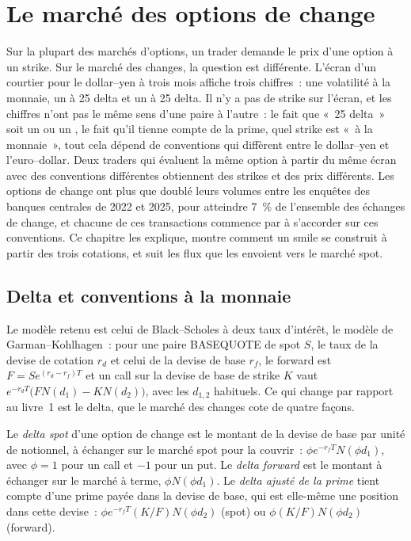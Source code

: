 \chapter{Le marché des options de change}\label{ch:m2:the-fx-options-market}

Sur la plupart des marchés d'options, un trader demande le prix d'une option à un strike.
Sur le marché des changes, la question est différente. L'écran d'un courtier
pour le dollar--yen à trois mois affiche trois chiffres~: une volatilité à la monnaie,
un  à 25 delta et un  à 25 delta. Il n'y a pas de strike sur l'écran, et
les chiffres n'ont pas le même sens d'une paire à l'autre~: le fait que «~25 delta~» soit
un  ou un , le fait qu'il tienne compte de la prime, quel strike est
«~à la monnaie~», tout cela dépend de conventions qui diffèrent entre le dollar--yen et
l'euro--dollar. Deux traders qui évaluent la même option à partir du même écran avec
des conventions différentes obtiennent des strikes et des prix différents. Les options de change
ont plus que doublé leurs volumes entre les enquêtes des banques centrales de 2022 et
2025, pour atteindre 7~\% de l'ensemble des échanges de change, et chacune de ces transactions commence par
à s'accorder sur ces conventions. Ce chapitre les explique, montre comment un smile se
construit à partir des trois cotations, et suit les flux que les  envoient
vers le marché spot.

\section{Delta et conventions à la monnaie}

Le modèle retenu est celui de Black--Scholes à deux taux d'intérêt, le
modèle de Garman--Kohlhagen~: pour une paire BASEQUOTE de spot $S$, le taux de la
devise de cotation $r_d$ et celui de la devise de base $r_f$, le forward est
$F = S e^{(r_d - r_f)T}$ et un call sur la devise de base de strike $K$ vaut
$e^{-r_d T}\bigl(F N(d_1) - K N(d_2)\bigr)$, avec les $d_{1,2}$ habituels. Ce qui change
par rapport au livre~1 est le delta, que le marché des changes cote de quatre façons.

\begin{definition}\label{def:m2:the-fx-options-market:delta}
Le \emph{delta spot} d'une option de change est le montant de la devise de base
par unité de notionnel, à échanger sur le marché spot pour la couvrir~:
$\phi e^{-r_f T} N(\phi d_1)$, avec $\phi = 1$ pour un call et $-1$ pour un put. Le
\emph{delta forward} est le montant à échanger sur le marché à terme,
$\phi N(\phi d_1)$. Le \emph{delta ajusté
de la prime} tient compte d'une prime payée dans
la devise de base, qui est elle-même une position dans cette devise~:
$\phi e^{-r_f T} (K/F) N(\phi d_2)$ (spot) ou $\phi (K/F) N(\phi d_2)$ (forward).
\end{definition}

